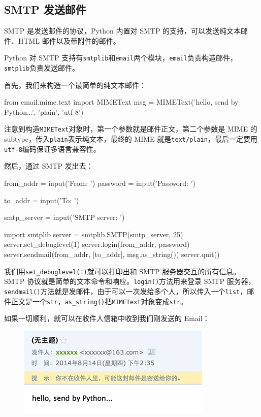 \hypertarget{smtp-ux53d1ux9001ux90aeux4ef6}{%
\subsection{SMTP 发送邮件}\label{smtp-ux53d1ux9001ux90aeux4ef6}}

SMTP 是发送邮件的协议，Python 内置对 SMTP
的支持，可以发送纯文本邮件、HTML 邮件以及带附件的邮件。

Python 对 SMTP
支持有\texttt{smtplib}和\texttt{email}两个模块，\texttt{email}负责构造邮件，\texttt{smtplib}负责发送邮件。

首先，我们来构造一个最简单的纯文本邮件：

\begin{pythoncode}
from email.mime.text import MIMEText
msg = MIMEText('hello, send by Python...', 'plain', 'utf-8')
\end{pythoncode}

注意到构造\texttt{MIMEText}对象时，第一个参数就是邮件正文，第二个参数是
MIME 的
subtype，传入\texttt{\textquotesingle{}plain\textquotesingle{}}表示纯文本，最终的
MIME
就是\texttt{\textquotesingle{}text/plain\textquotesingle{}}，最后一定要用\texttt{utf-8}编码保证多语言兼容性。

然后，通过 SMTP 发出去：

\begin{pythoncode}
from_addr = input('From: ')
password = input('Password: ')

to_addr = input('To: ')

smtp_server = input('SMTP server: ')

import smtplib
server = smtplib.SMTP(smtp_server, 25) 
server.set_debuglevel(1)
server.login(from_addr, password)
server.sendmail(from_addr, [to_addr], msg.as_string())
server.quit()
\end{pythoncode}

我们用\texttt{set\_debuglevel(1)}就可以打印出和 SMTP
服务器交互的所有信息。SMTP
协议就是简单的文本命令和响应。\texttt{login()}方法用来登录 SMTP
服务器，\texttt{sendmail()}方法就是发邮件，由于可以一次发给多个人，所以传入一个\texttt{list}，邮件正文是一个\texttt{str}，\texttt{as\_string()}把\texttt{MIMEText}对象变成\texttt{str}。

如果一切顺利，就可以在收件人信箱中收到我们刚发送的 Email：

 
 \begin{figure}[htp]
	\centering
	\includegraphics[width=0.6\linewidth]{fig/967446760519840.png}
\end{figure}


